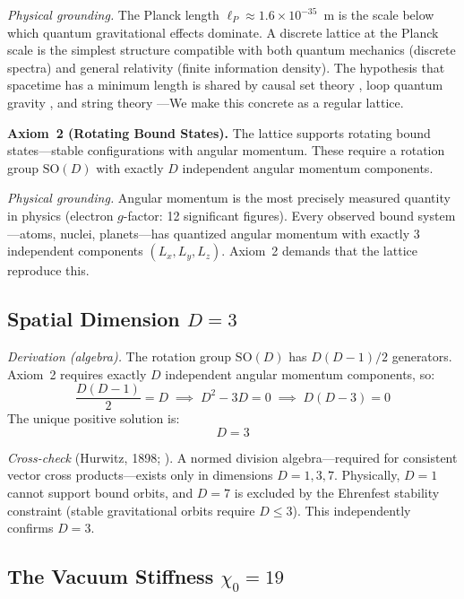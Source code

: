 \documentclass[12pt,a4paper]{article}
\newcommand{\chizero}{\chi_0}
\begin{document}
\textit{Physical grounding.} The Planck length $\ell_P \approx 1.6 \times 10^{-35}$~m is the scale below which quantum gravitational effects dominate. A discrete lattice at the Planck scale is the simplest structure compatible with both quantum mechanics (discrete spectra) and general relativity (finite information density). The hypothesis that spacetime has a minimum length is shared by causal set theory \citep{bombelli1987}, loop quantum gravity \citep{rovelli2004}, and string theory \citep{polchinski1998}---We make this concrete as a regular lattice.

\textbf{Axiom~2 (Rotating Bound States).} The lattice supports rotating bound states---stable configurations with angular momentum. These require a rotation group $\mathrm{SO}(D)$ with exactly $D$ independent angular momentum components.

\textit{Physical grounding.} Angular momentum is the most precisely measured quantity in physics (electron $g$-factor: 12 significant figures). Every observed bound system---atoms, nuclei, planets---has quantized angular momentum with exactly 3 independent components $(L_x, L_y, L_z)$. Axiom~2 demands that the lattice reproduce this.

\subsection{Spatial Dimension \texorpdfstring{$D = 3$}{D = 3}}

\textit{Derivation (algebra).} The rotation group $\mathrm{SO}(D)$ has $D(D-1)/2$ generators. Axiom~2 requires exactly $D$ independent angular momentum components, so:
\begin{equation}
\frac{D(D-1)}{2} = D \;\implies\; D^2 - 3D = 0 \;\implies\; D(D - 3) = 0
\end{equation}
The unique positive solution is:
\begin{equation}\label{eq:D3}
\boxed{D = 3}
\end{equation}

\textit{Cross-check} (Hurwitz, 1898; \citealt{Baez2002}). A normed division algebra---required for consistent vector cross products---exists only in dimensions $D = 1, 3, 7$. Physically, $D = 1$ cannot support bound orbits, and $D = 7$ is excluded by the Ehrenfest stability constraint \citep{Ehrenfest1917} (stable gravitational orbits require $D \leq 3$). This independently confirms $D = 3$.

\subsection{The Vacuum Stiffness \texorpdfstring{$\chizero = 19$}{chi0 = 19}}
\end{document}
